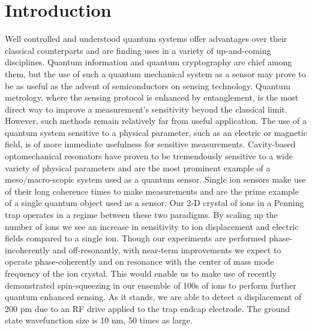 \documentclass[aps,prl,twocolumn,groupedaddress]{revtex4-1}
\begin{document}


\section{Introduction}
Well controlled and understood quantum systems offer advantages over their classical counterparts and are finding uses in a variety of up-and-coming disciplines. Quantum information and quantum cryptography are chief among them, but the use of such a quantum mechanical system as a sensor may prove to be as useful as the advent of semiconductors on sensing technology. Quantum metrology, where the sensing protocol is enhanced by entanglement, is the most direct way to improve a measurement’s sensitivity beyond the classical limit. However, such methods remain relatively far from useful application. The use of a quantum system sensitive to a physical parameter, such as an electric or magnetic field, is of more immediate usefulness for sensitive measurements. Cavity-based optomechanical resonators have proven to be tremendously sensitive to a wide variety of physical parameters and are the most prominent example of a meso/macro-scopic system used as a quantum sensor. Single ion sensors make use of their long coherence times to make measurements and are the prime example of a single quantum object used as a sensor. Our 2-D crystal of ions in a Penning trap operates in a regime between these two paradigms. By scaling up the number of ions we see an increase in sensitivity to ion displacement and electric fields compared to a single ion. Though our experiments are performed phase-incoherently and off-resonantly, with near-term improvements we expect to operate phase-coherently and on resonance with the center of mass mode frequency of the ion crystal. This would enable us to make use of recently demonstrated spin-squeezing in our ensemble of 100s of ions to perform further quantum enhanced sensing. As it stands, we are able to detect a displacement of 200 pm due to an RF drive applied to the trap endcap electrode. The ground state wavefunction size is 10 nm, 50 times as large.
\end{document}
